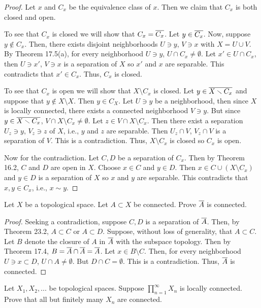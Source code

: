 \begin{proof}
Let $x$ and $C_x$ be the equivalence class of $x$. Then we claim
that $C_x$ is both closed and open.

To see that $C_x$ is closed we will show that
$C_x=\overline{C_x}$. Let $y\in\overline{C_x}$. Now, suppose $y\notin
C_x$. Then, there exists disjoint neighborhoods $U\ni y$, $V\ni
x$ with $X=U\cup V$. By Theorem 17.5(a), for every neighborhood
$U\ni y$, $U\cap C_x\neq\emptyset$. Let $x'\in U\cap C_x$, then
$U\ni x'$, $V\ni x$ is a separation of $X$ so $x'$ and $x$ are
separable. This contradicts that $x'\in C_x$. Thus, $C_x$ is
closed.

To see that $C_x$ is open we will show that $X\setminus C_x$ is
closed. Let $y\in\overline{X\smallsetminus C_x}$ and suppose that $y\notin
X\setminus X$. Then $y\in C_X$. Let $U\ni y$ be a neighborhood,
then since $X$ is locally connected, there exists a connected
neighborhood $V\ni y$. But since $y\in\overline{X\smallsetminus C_x}$,
$V\cap X\setminus C_x\neq\emptyset$. Let $z\in V\cap X\setminus
C_x$. Then there exist a separation $U_z\ni y$, $V_z\ni z$ of
$X$, i.e., $y$ and $z$ are separable. Then $U_z\cap V$, $V_z\cap
V$ is a separation of $V$. This is a contradiction. Thus,
$X\setminus C_x$ is closed so $C_x$ is open.

Now for the contradiction. Let $C,D$ be a separation of
$C_x$. Then by Theorem 16.2, $C$ and $D$ are open in $X$. Choose
$x\in C$ and $y\in D$. Then $x\in C\cup(X\setminus C_x)$ and
$y\in D$ is a separation of $X$ so $x$ and $y$ are
separable. This contradicts that $x,y\in C_x$, i.e., $x\sim y$.
\end{proof}
\begin{problem}
Let $X$ be a topological space. Let $A\subset X$ be
connected. Prove $\overline{A}$ is connected.
\end{problem}
\begin{proof}
Seeking a contradiction, suppose $C,D$ is a separation of $\overline{A}$. Then, by Theorem 23.2, $A\subset C$ or $A\subset D$. Suppose,
without loss of generality, that $A\subset C$. Let $B$ denote the
closure of $A$ in $\overline{A}$ with the subspace topology. Then by
Theorem 17.4, $B=\overline{A}\cap\overline{A}=\overline{A}$. Let $x\in
B\setminus C$. Then, for every neighborhood $U\ni x\subset D$,
$U\cap A\neq\emptyset$. But $D\cap C=\emptyset$. This is a
contradiction. Thus, $\overline{A}$ is connected.
\end{proof}
\begin{problem}
Let $X_1,X_2,...$ be topological spaces. Suppose
$\prod_{n=1}^\infty X_n$ is locally connected. Prove that all but
finitely many $X_n$ are connected.
\end{problem}
